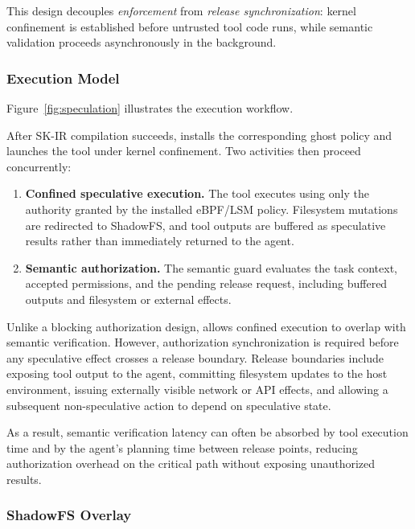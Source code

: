 This design decouples \emph{enforcement} from \emph{release synchronization}:
kernel confinement is established before untrusted tool code runs, while
semantic validation proceeds asynchronously in the background.

\subsubsection{Execution Model}
\label{sec:design:speculative:protocol}

Figure~\ref{fig:speculation} illustrates the execution workflow.

After SK-IR compilation succeeds, \SystemName installs the corresponding ghost
policy and launches the tool under kernel confinement. Two activities then
proceed concurrently:

\begin{enumerate}[leftmargin=1.2em]
\item \textbf{Confined speculative execution.}
The tool executes using only the authority granted by the installed eBPF/LSM
policy. Filesystem mutations are redirected to ShadowFS, and tool outputs are
buffered as speculative results rather than immediately returned to the agent.

\item \textbf{Semantic authorization.}
The semantic guard evaluates the task context, accepted permissions, and the
pending release request, including buffered outputs and filesystem or external
effects.
\end{enumerate}

Unlike a blocking authorization design, \SystemName allows confined execution
to overlap with semantic verification. However, authorization synchronization
is required before any speculative effect crosses a release boundary. Release
boundaries include exposing tool output to the agent, committing filesystem
updates to the host environment, issuing externally visible network or API
effects, and allowing a subsequent non-speculative action to depend on
speculative state.

As a result, semantic verification latency can often be absorbed by tool
execution time and by the agent's planning time between release points, reducing
authorization overhead on the critical path without exposing unauthorized
results.

\subsubsection{ShadowFS Overlay}
\label{sec:design:speculative:shadowfs}

